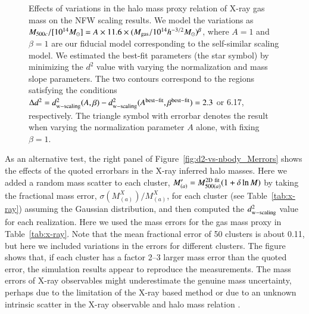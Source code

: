 \documentclass[iop, apj]{emulateapj}
\newcommand{\?}{\stackrel{?}{=}}
\begin{document}
%
\begin{figure}
 \caption{Effects of variations in the halo mass proxy relation of X-ray
 gas mass on the NFW scaling results.  We model the variations as
 $M_{500c}/[10^{14}M_\odot]=A\times 11.6\times (M_{\rm
 gas}/10^{14}h^{-3/2}M_\odot)^{\beta}$, where $A=1$ and $\beta=1$ are
 our fiducial model corresponding to the self-similar scaling model. We
 estimated the best-fit parameters (the star symbol) by
 minimizing the $d^2$ value with varying the normalization and mass
 slope parameters. The two contours correspond to the regions satisfying
 the conditions $\Delta d^2=d_{\rm w-scaling}^2(A,\beta) - d_{\rm
 w-scaling}^2(A^{\rm best-fit},\beta^{\rm best-fit})= 2.3$ or 6.17,
 respectively. The triangle symbol with errorbar denotes the result when
 varying the normalization parameter $A$ alone, with fixing $\beta=1$.
}
\label{fig:Mgas-M500_three}
\end{figure}
%
As an alternative test, the right panel of
Figure~\ref{fig:d2-vs-nbody_Merrors} shows the effects of the quoted
errorbars in the X-ray inferred halo masses. Here we added a random mass
scatter to each cluster,
$M^{\prime}_{(a)}=M_{500(a)}^{\rm{2D~fit}}(1+\delta \ln M)$ by taking
the fractional mass error, $\sigma(M^X_{(a)})/M^X_{(a)}$, for each
cluster (see Table~\ref{tab:x-ray}) assuming the Gaussian distribution,
and then computed the $d^2_{\rm w-scaling}$ value for each realization.
Here we used the mass errors for the gas mass proxy in
Table~\ref{tab:x-ray}. Note that the mean fractional error of 50
clusters is about 0.11, but here we included variations in the errors
for different clusters.  The figure shows that, if each cluster has a
factor 2--3 larger mass error than the quoted error, the simulation
results appear to reproduce the measurements.
The mass errors of X-ray observables might underestimate the genuine
mass uncertainty, perhaps due to the limitation of the X-ray based
method or due to an unknown intrinsic scatter in the X-ray observable
and halo mass relation \citep[see also][for the similar
discussion]{Okabeetal:10b}.
\end{document}
